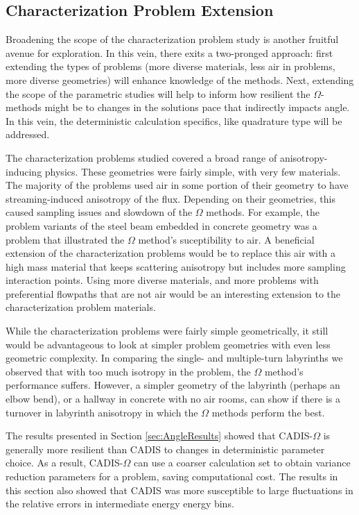 \subsection{Characterization Problem Extension}
\label{subsec:extendcharprobs}

Broadening the scope
of the characterization problem study
is another fruitful avenue for exploration. In this
vein, there exits a two-pronged approach: first extending the types of problems
(more diverse materials, less air in problems, more diverse geometries) will
enhance knowledge of the methods. Next, extending the scope of the parametric
studies will help to inform how resilient the $\Omega$-methods might be to
changes in the solutions pace that indirectly impacts angle.
In this vein, the deterministic calculation specifics, like
quadrature type will be addressed.

The characterization problems studied covered a broad range of
anisotropy-inducing physics. These geometries were fairly simple, with very few
materials. The majority of the problems used air in some portion of their
geometry to have streaming-induced anisotropy of the flux. Depending on their
geometries, this caused sampling issues and slowdown of the $\Omega$ methods.
For example, the problem variants of the
steel beam embedded in concrete geometry was a
problem that illustrated the $\Omega$ method's suceptibility to air. A
beneficial extension of the characterization problems would be to replace this
air with a high mass material that keeps scattering anisotropy but includes more
sampling interaction points. Using more diverse materials, and more problems
with preferential flowpaths that are not air would be an interesting extension
to the characterization problem materials.

While the characterization problems were fairly simple geometrically, it still
would be advantageous to look at simpler problem geometries with even less
geometric complexity. In
comparing the single- and multiple-turn labyrinths we observed that with too
much isotropy in the problem, the $\Omega$ method's performance suffers.
However, a simpler
geometry of the labyrinth (perhaps an elbow bend), or a hallway in concrete with
no air rooms, can show if there is a turnover in labyrinth anisotropy in which
the $\Omega$ methods perform the best.

The results presented in Section \ref{sec:AngleResults} showed that
CADIS-$\Omega$ is generally more resilient than CADIS to changes in
deterministic parameter choice. As a result, CADIS-$\Omega$ can use a coarser
calculation set to obtain variance reduction parameters for a problem, saving
computational cost. The results in this section also showed that CADIS was more
susceptible to large fluctuations in the relative errors in intermediate energy
energy bins.

